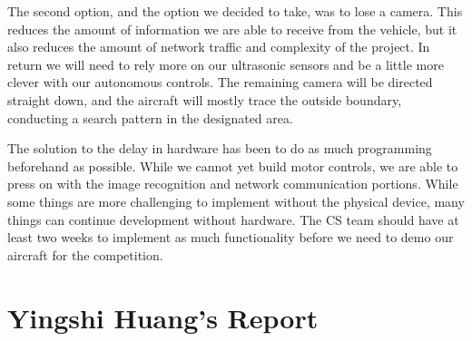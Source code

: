 \documentclass[onecolumn, draftclsnofoot,10pt, compsoc]{IEEEtran}
\begin{document}
The second option, and the option we decided to take, was to lose a camera. This reduces the amount of information we are able to receive from the vehicle, but it also reduces the amount of network traffic and complexity of the project. In return we will need to rely more on our ultrasonic sensors and be a little more clever with our autonomous controls. The remaining camera will be directed straight down, and the aircraft will mostly trace the outside boundary, conducting a search pattern in the designated area.

The solution to the delay in hardware has been to do as much programming beforehand as possible. While we cannot yet build motor controls, we are able to press on with the image recognition and network communication portions. While some things are more challenging to implement without the physical device, many things can continue development without hardware. The CS team should have at least two weeks to implement as much functionality before we need to demo our aircraft for the competition.




\section{Yingshi Huang's Report}
\end{document}
